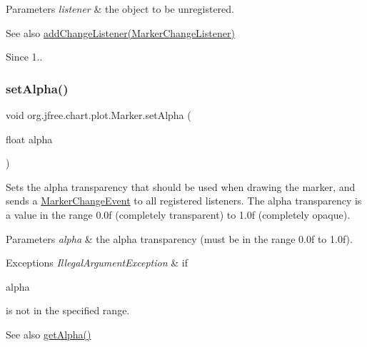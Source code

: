 \begin{DoxyParams}{Parameters}
{\em listener} & the object to be unregistered.\\
\hline
\end{DoxyParams}
\begin{DoxySeeAlso}{See also}
\mbox{\hyperlink{classorg_1_1jfree_1_1chart_1_1plot_1_1_marker_a8e820405ec8c80e7c4f4a4189823732d}{add\+Change\+Listener(\+Marker\+Change\+Listener)}}
\end{DoxySeeAlso}
\begin{DoxySince}{Since}
1.. 
\end{DoxySince}
\mbox{\label{classorg_1_1jfree_1_1chart_1_1plot_1_1_marker_aa8bd3303290bf0be26e17c90794a434f}} 
\subsubsection{\texorpdfstring{set\+Alpha()}{setAlpha()}}
{\footnotesize\ttfamily void org.\+jfree.\+chart.\+plot.\+Marker.\+set\+Alpha (\begin{DoxyParamCaption}\item[{float}]{alpha }\end{DoxyParamCaption})}

Sets the alpha transparency that should be used when drawing the marker, and sends a \mbox{\hyperlink{}{Marker\+Change\+Event}} to all registered listeners. The alpha transparency is a value in the range 0.\+0f (completely transparent) to 1.\+0f (completely opaque).


\begin{DoxyParams}{Parameters}
{\em alpha} & the alpha transparency (must be in the range 0.\+0f to 1.\+0f).\\
\hline
\end{DoxyParams}

\begin{DoxyExceptions}{Exceptions}
{\em Illegal\+Argument\+Exception} & if
\begin{DoxyCode}
alpha 
\end{DoxyCode}
 is not in the specified range.\\
\hline
\end{DoxyExceptions}
\begin{DoxySeeAlso}{See also}
\mbox{\hyperlink{classorg_1_1jfree_1_1chart_1_1plot_1_1_marker_a922320b156d95ee82de7a831f03a520c}{get\+Alpha()}} 
\end{DoxySeeAlso}
\mbox{\label{classorg_1_1jfree_1_1chart_1_1plot_1_1_marker_a3e54b16046fd62f5c8bf9f2d5afee450}} 
